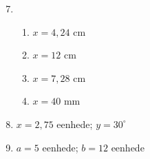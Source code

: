 {\begin{multicols}{3}
\begin{enumerate}[noitemsep, label=\textbf{\arabic*}.]
\setcounter{enumi}{6}
      \item %
	  \begin{enumerate}[noitemsep, label=\textbf{(\alph*)} ]
	\item $x=4,24$ cm%

\item $x=12$ cm%

\item $x=7,28$ cm%

\item $x=40$ mm%
	  \end{enumerate}
\setcounter{enumi}{8}
      \item  $x=2,75$ eenhede; $y=30^{\circ}$%

      \item  $a=5$ eenhede; $b=12$ eenhede%


\end{enumerate}
\end{multicols}}
